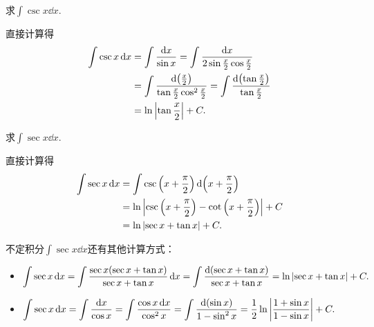 \begin{example}
求\(\int \csc x \dd{x}\).
\begin{solution}
直接计算得
\begin{align*}
	\int \csc x \dd{x}
	&= \int \frac{\dd{x}}{\sin x}
	= \int \frac{\dd{x}}{2 \sin\frac{x}{2} \cos\frac{x}{2}} \\
	&= \int \frac{\dd(\frac{x}{2})}{\tan\frac{x}{2} \cos^2\frac{x}{2}}
	= \int \frac{\dd(\tan\frac{x}{2})}{\tan\frac{x}{2}} \\
	&= \ln\abs{\tan\frac{x}{2}} + C.
\end{align*}
\end{solution}
\end{example}

\begin{example}
求\(\int \sec x \dd{x}\).
\begin{solution}
直接计算得\begin{align*}
	\int \sec x \dd{x}
	&= \int \csc\left(x+\frac\pi2\right) \dd(x+\frac\pi2) \\
	&= \ln\abs{\csc\left(x+\frac\pi2\right)-\cot\left(x+\frac\pi2\right)} + C \\
	&= \ln\abs{\sec x+\tan x} + C.
\end{align*}
\end{solution}
\end{example}
\begin{remark}
不定积分\(\int \sec x \dd{x}\)还有其他计算方式：
\begin{itemize}
	\item \(\begin{aligned}[t]
		\int \sec x \dd{x}
		= \int \frac{\sec x (\sec x + \tan x)}{\sec x + \tan x} \dd{x}
		= \int \frac{\dd(\sec x + \tan x)}{\sec x + \tan x}
		= \ln\abs{\sec x + \tan x} + C.
	\end{aligned}\)

	\item \(\begin{aligned}[t]
		\int \sec x \dd{x}
		= \int \frac{\dd{x}}{\cos x}
		= \int \frac{\cos x \dd{x}}{\cos^2x}
		= \int \frac{\dd(\sin x)}{1 - \sin^2x}
		= \frac12 \ln\abs{\frac{1+\sin x}{1-\sin x}} + C.
	\end{aligned}\)
\end{itemize}
\end{remark}

